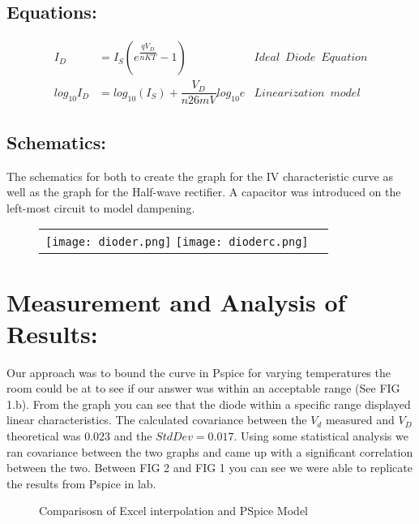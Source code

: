 \documentclass[10pt,a4paper]{article}
\begin{document}
\subsection{Equations:}
 
\begin{align}
I_{D} &= I_{S}(e^{\dfrac{qV_{D}}{nKT}}-1) & Ideal \enspace Diode \enspace Equation \\
log_{10} I_{D} &= log_{10} (I_{S}) + \dfrac{V_{D}}{n26mV} log_{10} e & Linearization \enspace model
\end{align}

\pagebreak
\subsection{Schematics:}
The schematics for both to create the graph for the IV characteristic curve as well as the graph for the Half-wave rectifier. A capacitor was introduced on the left-most circuit to model dampening.
\begin{figure} [!ht]%
\begin{tabular}{l l}
 \texttt{[image: dioder.png]}
{\texttt{[image: dioderc.png]}} 
\end{tabular} 
\end{figure}


\section*{Measurement and Analysis of Results:}
Our approach was to bound the curve in Pspice for varying temperatures the room could be at to see if our answer was within an acceptable range  (See FIG 1.b). From the graph you can see that the diode within a specific range displayed linear characteristics. The calculated covariance between the $V_{d}$ measured and $V_{D}$ theoretical was $0.023$ and the $StdDev=0.017$. Using some statistical analysis we ran covariance between the two graphs and came up with a significant correlation between the two. Between FIG 2 and FIG 1 you can see we were able to replicate the results from Pspice in lab. 
\begin{figure}[!ht]
    \centering
    \qquad
    \caption{Comparisosn of Excel interpolation  and PSpice Model}%
    \label{fig:example}%
    
\end{figure}
\end{document}
